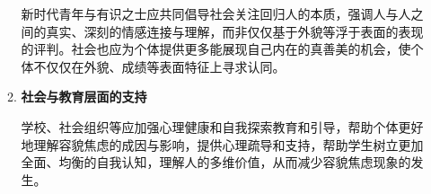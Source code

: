 \begin{enumerate}[leftmargin=7em]
\begin{enumerate}
        新时代青年与有识之士应共同倡导社会关注回归人的本质，强调人与人之间的真实、深刻的情感连接与理解，而非仅仅基于外貌等浮于表面的表现的评判。社会也应为个体提供更多能展现自己内在的真善美的机会，使个体不仅仅在外貌、成绩等表面特征上寻求认同。

        \item \textbf{社会与教育层面的支持}

        学校、社会组织等应加强心理健康和自我探索教育和引导，帮助个体更好地理解容貌焦虑的成因与影响，提供心理疏导和支持，帮助学生树立更加全面、均衡的自我认知，理解人的多维价值，从而减少容貌焦虑现象的发生。
    \end{enumerate}
\end{enumerate}
